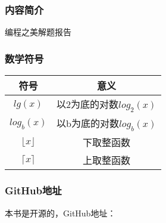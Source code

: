 \subsubsection{内容简介}
编程之美解题报告
\subsubsection{数学符号}
\begin{center}
	\begin{table}[!hbp]
		\begin{tabular}{c|c} \hline
			符号 & 意义 \\ \hline
			$lg(x)$ & 以2为底的对数$log_2(x)$ \\
			$log_b(x)$ & 以b为底的对数$log_b(x)$ \\
			$\lfloor x \rfloor$ & 下取整函数 \\
			$\lceil x \rceil$ & 上取整函数 \\ \hline
		\end{tabular}
	\end{table}
\end{center}
\subsubsection{GitHub地址}
本书是开源的，GitHub地址：
